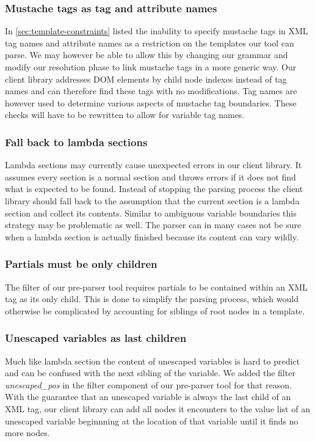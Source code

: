 \documentclass[thesis.tex]{subfiles}
\begin{document}
\subsubsection{Mustache tags as tag and attribute names}
In \ref{sec:template-constraints} listed the inability to specify mustache
tags in XML tag names and attribute names as a restriction on the templates our
tool can parse. We may however be able to allow this by changing our grammar and
modify our resolution phase to link mustache tags in a more generic way.
Our client library addresses DOM elements by child node indexes instead of tag
names and can therefore find these tags with no modifications. Tag names are
however used to determine various aspects of mustache tag boundaries. These
checks will have to be rewritten to allow for variable tag names.

\subsubsection{Fall back to lambda sections}
Lambda sections may currently cause unexpected errors in our client library.
It assumes every section is a normal section and throws errors if it does not
find what is expected to be found. Instead of stopping the parsing process
the client library should fall back to the assumption that the current section
is a lambda section and collect its contents. Similar to ambiguous variable
boundaries this strategy may be problematic as well. The parser can in many
cases not be sure when a lambda section is actually finished because its content
can vary wildly.

\subsubsection{Partials must be only children}
\label{sec:partial-only-child}
The filter of our pre-parser tool requires partials to be contained within an
XML tag as its only child. This is done to simplify the parsing process, which
would otherwise be complicated by accounting for siblings of root nodes in
a template.

\subsubsection{Unescaped variables as last children}
\label{sec:unescaped-variable-filter}
Much like lambda section the content of unescaped variables is hard to predict
and can be confused with the next sibling of the variable. We added the filter
\emph{unescaped\_pos} in the filter component of our pre-parser tool for that
reason. With the guarantee that an unescaped variable is always the last child
of an XML tag, our client library can add all nodes it encounters to the value
list of an unescaped variable beginnning at the location of that variable until
it finds no more nodes.
\end{document}
